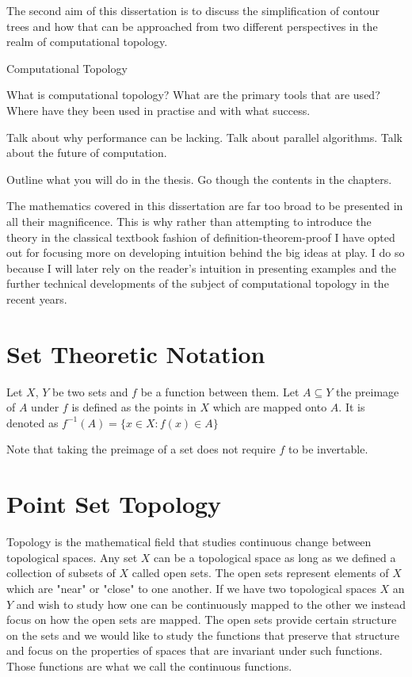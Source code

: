 The second aim of this dissertation is to discuss the simplification of contour trees and how that can be approached from two different perspectives in the realm of computational topology. 


Computational Topology 



What is computational topology?
What are the primary tools that are used?
Where have they been used in practise and with what success.

Talk about why performance can be lacking.
Talk about parallel algorithms.
Talk about the future of computation.

Outline what you will do in the thesis.
Go though the contents in the chapters.


The mathematics covered in this dissertation are far too broad to be presented in all their magnificence. This is why rather than attempting to introduce the theory in the classical textbook fashion of definition-theorem-proof I have opted out for focusing more on developing intuition behind the big ideas at play. I do so because I will later rely on the reader's intuition in presenting examples and the further technical developments of the subject of computational topology in the recent years. 

\section{Set Theoretic Notation}


\begin{defn} Let $X$, $Y$ be two sets and $f$ be a function between them. Let $A \subseteq Y$ the preimage of $A$ under $f$ is defined as the points in $X$ which are mapped onto $A$. It is denoted as $f^{-1}(A) = \{x \in X : f(x) \in A\}$  \end{defn}

Note that taking the preimage of a set does not require $f$ to be invertable.

\section{Point Set Topology}

Topology is the mathematical field that studies continuous change between topological spaces. Any set $X$ can be a topological space as long as we defined a collection of subsets of $X$ called open sets. The open sets represent elements of $X$ which are "near" or "close" to one another. If we have two topological spaces $X$ an $Y$ and wish to study how one can be continuously mapped to the other we instead focus on how the open sets are mapped. The open sets provide certain structure on the sets and we would like to study the functions that preserve that structure and focus on the properties of spaces that are invariant under such functions. Those functions are what we call the continuous functions.

